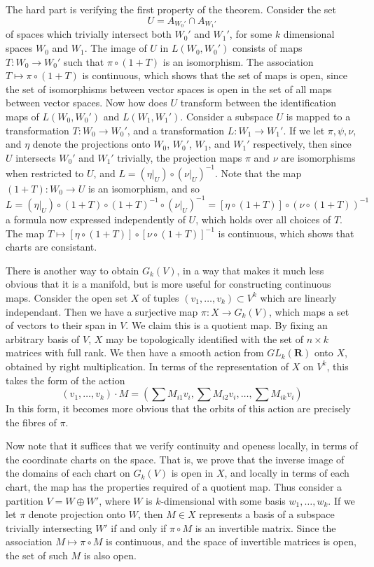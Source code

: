 \begin{example}
    The hard part is verifying the first property of the theorem. Consider the set
    \[ U = A_{W_0'} \cap A_{W_1'} \]
    of spaces which trivially intersect both $W_0'$ and $W_1'$, for some $k$ dimensional spaces $W_0$ and $W_1$. The image of $U$ in $L(W_0,W_0')$ consists of maps $T: W_0 \to W_0'$ such that $\pi \circ (1 + T)$ is an isomorphism. The association $T \mapsto \pi \circ (1 + T)$ is continuous, which shows that the set of maps is open, since the set of isomorphisms between vector spaces is open in the set of all maps between vector spaces. Now how does $U$ transform between the identification maps of $L(W_0,W_0')$ and $L(W_1,W_1')$. Consider a subspace $U$ is mapped to a transformation $T:W_0 \to W_0'$, and a transformation $L: W_1 \to W_1'$. If we let $\pi, \psi, \nu$, and $\eta$ denote the projections onto $W_0$, $W_0'$, $W_1$, and $W_1'$ respectively, then since $U$ intersects $W_0'$ and $W_1'$ trivially, the projection maps $\pi$ and $\nu$ are isomorphisms when restricted to $U$, and $L = (\eta|_U) \circ (\nu|_U)^{-1}$. Note that the map $(1 + T): W_0 \to U$ is an isomorphism, and so
    \[ L = (\eta|_U) \circ (1 + T) \circ (1 + T)^{-1} \circ (\nu|_U)^{-1} = [\eta \circ (1 + T)] \circ (\nu \circ (1 + T))^{-1} \]
    a formula now expressed independently of $U$, which holds over all choices of $T$. The map $T \mapsto [\eta \circ (1 + T)] \circ [\nu \circ (1 + T)]^{-1}$ is continuous, which shows that charts are consistant.

    There is another way to obtain $G_k(V)$, in a way that makes it much less obvious that it is a manifold, but is more useful for constructing continuous maps. Consider the open set $X$ of tuples $(v_1, \dots, v_k) \subset V^k$ which are linearly independant. Then we have a surjective map $\pi: X \to G_k(V)$, which maps a set of vectors to their span in $V$. We claim this is a quotient map. By fixing an arbitrary basis of $V$, $X$ may be topologically identified with the set of $n \times k$ matrices with full rank. We then have a smooth action from $GL_k(\mathbf{R})$ onto $X$, obtained by right multiplication. In terms of the representation of $X$ on $V^k$, this takes the form of the action
    \[ (v_1, \dots, v_k) \cdot M = \left( \sum M_{i1} v_i, \sum M_{i2} v_i, \dots, \sum M_{ik} v_i \right) \]
    In this form, it becomes more obvious that the orbits of this action are precisely the fibres of $\pi$.

    Now note that it suffices that we verify continuity and openess locally, in terms of the coordinate charts on the space. That is, we prove that the inverse image of the domains of each chart on $G_k(V)$ is open in $X$, and locally in terms of each chart, the map has the properties required of a quotient map. Thus consider a partition $V = W \oplus W'$, where $W$ is $k$-dimensional with some basis $w_1, \dots, w_k$. If we let $\pi$ denote projection onto $W$, then $M \in X$ represents a basis of a subspace trivially intersecting $W'$ if and only if $\pi \circ M$ is an invertible matrix. Since the association $M \mapsto \pi \circ M$ is continuous, and the space of invertible matrices is open, the set of such $M$ is also open.


\end{example}
